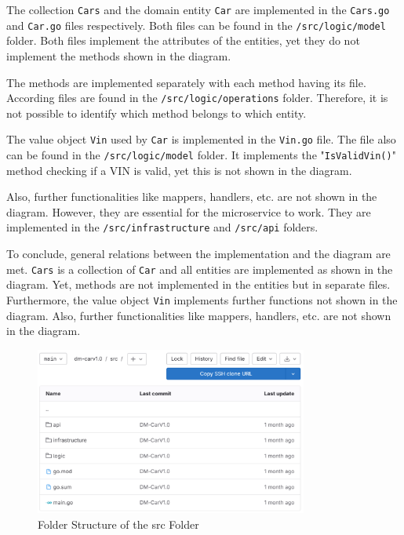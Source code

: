 The collection \texttt{Cars} and the domain entity \texttt{Car} are implemented in the \texttt{Cars.go} and \texttt{Car.go} files respectively.
Both files can be found in the \texttt{/src/logic/model} folder.
Both files implement the attributes of the entities, yet they do not implement the methods shown in the diagram.

The methods are implemented separately with each method having its file.
According files are found in the \texttt{/src/logic/operations} folder.
Therefore, it is not possible to identify which method belongs to which entity.

The value object \texttt{Vin} used by \texttt{Car} is implemented in the \texttt{Vin.go} file.
The file also can be found in the \texttt{/src/logic/model} folder.
It implements the "\texttt{IsValidVin()}" method checking if a VIN is valid, yet this is not shown in the diagram.

Also, further functionalities like mappers, handlers, etc. are not shown in the diagram.
However, they are essential for the microservice to work.
They are implemented in the \texttt{/src/infrastructure} and \texttt{/src/api} folders.

To conclude, general relations between the implementation and the diagram are met.
\texttt{Cars} is a collection of \texttt{Car} and all entities are implemented as shown in the diagram.
Yet, methods are not implemented in the entities but in separate files.
Furthermore, the value object \texttt{Vin} implements further functions not shown in the diagram.
Also, further functionalities like mappers, handlers, etc. are not shown in the diagram.

\begin{figure}
    \centering
    \includegraphics[width=0.8\textwidth]{figures/microservices/dmCar/ms_dmCar_srcFolderStructure.png}
    \caption{Folder Structure of the src Folder}
    \label{fig:ms_dmCar_srcFolderStructure}
\end{figure}
